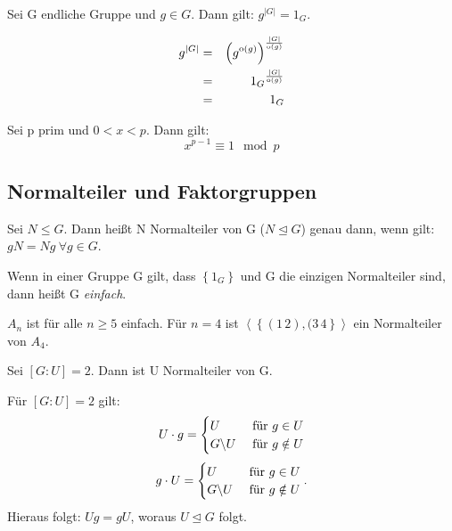 \documentclass[10pt]{scrbook}
\begin{document}
\begin{Kor}
Sei G endliche Gruppe und $g\in G$. Dann gilt: $g^{\left|G\right|}=1_G$.
\end{Kor}
\begin{bew}
\begin{eqnarray*}
	g^{\left|G\right|} & = & \left(g^{\operatorname{o}(g)}\right)^{\frac{\left|G\right|}{\operatorname{o}(g)}} \\
	& = & {1_G}^{\frac{\left|G\right|}{\operatorname{o}(g)}} \\
	& = & 1_G
\end{eqnarray*}
\end{bew}

\begin{Kor}
Sei p prim und $0<x<p$. Dann gilt:
\begin{displaymath}
	x^{p-1}\equiv 1 \mod p
\end{displaymath}
\end{Kor}

\subsection{Normalteiler und Faktorgruppen}

\begin{Def}
Sei $N\leq G$. Dann heißt N Normalteiler von G ($N\trianglelefteq G$) genau dann, wenn gilt: $g N=N g\ \forall g\in G$.
\end{Def}

\begin{Def}
Wenn in einer Gruppe G gilt, dass $\left\{1_G\right\}$ und G die einzigen Normalteiler sind, dann heißt G \emph{einfach}.
\end{Def}

\begin{Bsp}
$A_n$ ist für alle $n\geq 5$ einfach. Für $n=4$ ist $\left\langle\left\{(1\,2), (3\,4\right\}\right\rangle$ ein Normalteiler von $A_4$.
\end{Bsp}

\begin{Le}
Sei $[G : U]=2$. Dann ist U Normalteiler von G.
\end{Le}
\begin{bew}
Für $[G : U]=2$ gilt:
\begin{displaymath}
	U\cdot g=\begin{cases}
	U & \textnormal{ für } g\in U \\
	G\backslash U & \textnormal{ für } g\notin U
	\end{cases}
\end{displaymath}
\begin{displaymath}
	g\cdot U=\begin{cases}
	U & \textnormal{ für } g\in U \\
	G\backslash U & \textnormal{ für } g\notin U
	\end{cases}.
\end{displaymath}
	Hieraus folgt: $U g=g U$, woraus $U\trianglelefteq G$ folgt.
\end{bew}
\end{document}
